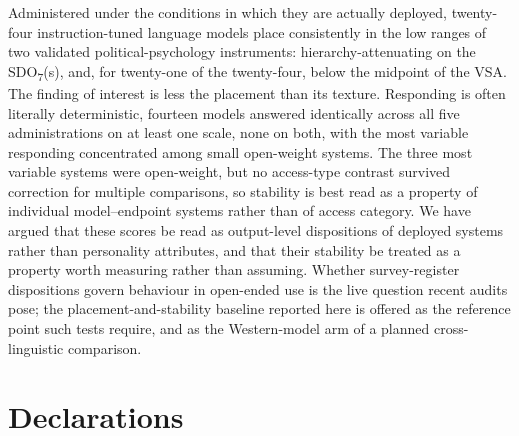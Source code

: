 \documentclass[
]{article}
\newcounter{none} %
\begin{document}
Administered under the conditions in which they are actually deployed,
twenty-four instruction-tuned language models place consistently in the
low ranges of two validated political-psychology instruments:
hierarchy-attenuating on the SDO\textsubscript{7}(s), and, for
twenty-one of the twenty-four, below the midpoint of the VSA. The
finding of interest is less the placement than its texture. Responding
is often literally deterministic, fourteen models answered identically
across all five administrations on at least one scale, none on both,
with the most variable responding concentrated among small open-weight
systems. The three most variable systems were open-weight, but no
access-type contrast survived correction for multiple comparisons, so
stability is best read as a property of individual model--endpoint
systems rather than of access category. We have argued that these scores
be read as output-level dispositions of deployed systems rather than
personality attributes, and that their stability be treated as a
property worth measuring rather than assuming. Whether survey-register
dispositions govern behaviour in open-ended use is the live question
recent audits pose; the placement-and-stability baseline reported here
is offered as the reference point such tests require, and as the
Western-model arm of a planned cross-linguistic comparison.

\section*{Declarations}\label{declarations}
\end{document}
